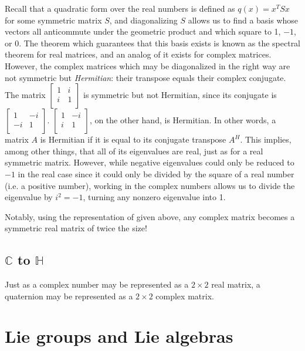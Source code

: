 \documentclass{article}
\begin{document}
Recall that a quadratic form over the real numbers
is defined as $q(x) = x^TSx$ for some symmetric matrix $S$,
and diagonalizing $S$ allows us to find a basis
whose vectors all anticommute under the geometric product
and which square to 1, $-1$, or 0.
The theorem which guarantees that this basis exists
is known as the spectral theorem for real matrices,
and an analog of it exists for complex matrices.
However, the complex matrices which may be diagonalized in the right way
are not symmetric but \textit{Hermitian}:
their transpose equals their complex conjugate.
The matrix
$\begin{bmatrix}
  1 & i \\
  i & 1 \\
\end{bmatrix}$
is symmetric but not Hermitian,
since its conjugate is
$\begin{bmatrix}
  1 & -i \\
  -i & 1 \\
\end{bmatrix}$.
$\begin{bmatrix}
  1 & -i \\
  i & 1 \\
\end{bmatrix}$,
on the other hand, is Hermitian.
In other words, a matrix $A$ is Hermitian
if it is equal to its conjugate transpose $A^H$.
This implies, among other things,
that all of its eigenvalues are real,
just as for a real symmetric matrix.
However, while negative eigenvalues could only be reduced to $-1$ in the real case
since it could only be divided by the square of a real number (i.e. a positive number),
working in the complex numbers allows us to divide the eigenvalue by $i^2=-1$,
turning any nonzero eigenvalue into 1.


Notably, using the representation of given above,
any complex matrix becomes a symmetric real matrix of twice the size!

\subsection{\texorpdfstring{$\mathbb{C}$}{C} to \texorpdfstring{$\mathbb{H}$}{H}}

Just as a complex number may be represented as a $2 \times 2$ real matrix,
a quaternion may be represented as a $2 \times 2$ complex matrix.

\section{Lie groups and Lie algebras}
\end{document}
